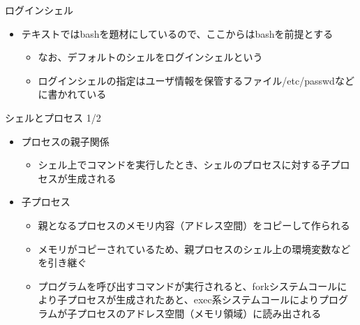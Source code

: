 \documentclass[12pt,aspectratio=169]{beamer}
\begin{document}
\begin{frame}{ログインシェル}
  \begin{itemize}
    \item テキストではbashを題材にしているので、ここからはbashを前提とする
      \begin{itemize}
        \item なお、デフォルトのシェルをログインシェルという
        \item ログインシェルの指定はユーザ情報を保管するファイル/etc/passwdなどに書かれている
      \end{itemize}

  \end{itemize}

\end{frame}
\begin{frame}{シェルとプロセス 1/2}
  \begin{itemize}
    \item プロセスの親子関係
      \begin{itemize}
        \item シェル上でコマンドを実行したとき、シェルのプロセスに対する子プロセスが生成される
      \end{itemize}
    \item 子プロセス
      \begin{itemize}
        \item 親となるプロセスのメモリ内容（アドレス空間）をコピーして作られる
        \item メモリがコピーされているため、親プロセスのシェル上の環境変数などを引き継ぐ
        \item プログラムを呼び出すコマンドが実行されると、forkシステムコールにより子プロセスが生成されたあと、exec系システムコールによりプログラムが子プロセスのアドレス空間（メモリ領域）に読み出される
      \end{itemize}

  \end{itemize}

\end{frame}
\end{document}
